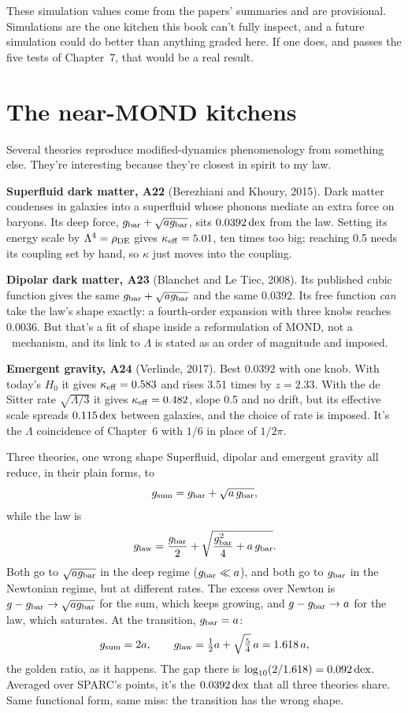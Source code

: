 \begin{honestbox}
These simulation values come from the papers' summaries and are provisional. Simulations are the one kitchen this book can't fully inspect, and a future simulation could do better than anything graded here. If one does, and passes the five tests of Chapter~7, that would be a real result.
\end{honestbox}

\section{The near-MOND kitchens}

Several theories reproduce modified-dynamics phenomenology from something else. They're interesting because they're closest in spirit to my law.

\textbf{Superfluid dark matter, A22} (Berezhiani and Khoury, 2015). Dark matter condenses in galaxies into a superfluid whose phonons mediate an extra force on baryons. Its deep force, $g_{\rm bar}+\sqrt{ag_{\rm bar}}$, sits $0.0392\,\mathrm{dex}$ from the law. Setting its energy scale by $\Lambda^4=\rho_{\rm DE}$ gives $\kappa_{\rm eff}=5.01$, ten times too big; reaching 0.5 needs its coupling set by hand, so $\kappa$ just moves into the coupling.

\textbf{Dipolar dark matter, A23} (Blanchet and Le Tiec, 2008). Its published cubic function gives the same $g_{\rm bar}+\sqrt{ag_{\rm bar}}$ and the same $0.0392$. Its free function \emph{can} take the law's shape exactly: a fourth-order expansion with three knobs reaches $0.0036$. But that's a fit of shape inside a reformulation of MOND, not a \LCDM\ mechanism, and its link to $\Lambda$ is stated as an order of magnitude and imposed.

\textbf{Emergent gravity, A24} (Verlinde, 2017). Best $0.0392$ with one knob. With today's $H_0$ it gives $\kappa_{\rm eff}=0.583$ and rises 3.51 times by $z=2.33$. With the de Sitter rate $\sqrt{\Lambda/3}$ it gives $\kappa_{\rm eff}=0.482$, slope 0.5 and no drift, but its effective scale spreads $0.115\,\mathrm{dex}$ between galaxies, and the choice of rate is imposed. It's the $\Lambda$ coincidence of Chapter~6 with $1/6$ in place of $1/2\pi$.

\begin{mathbox}{Three theories, one wrong shape}
Superfluid, dipolar and emergent gravity all reduce, in their plain forms, to
\[
g_{\rm sum}=g_{\rm bar}+\sqrt{a\,g_{\rm bar}},
\]
while the law is
\[
g_{\rm law}=\frac{g_{\rm bar}}{2}+\sqrt{\frac{g_{\rm bar}^2}{4}+a\,g_{\rm bar}}.
\]
Both go to $\sqrt{ag_{\rm bar}}$ in the deep regime ($g_{\rm bar}\ll a$), and both go to $g_{\rm bar}$ in the Newtonian regime, but at different rates. The excess over Newton is $g-g_{\rm bar}\to\sqrt{ag_{\rm bar}}$ for the sum, which keeps growing, and $g-g_{\rm bar}\to a$ for the law, which saturates. At the transition, $g_{\rm bar}=a$:
\[
g_{\rm sum}=2a,\qquad g_{\rm law}=\tfrac12a+\sqrt{\tfrac54}\,a=1.618\,a,
\]
the golden ratio, as it happens. The gap there is $\log_{10}(2/1.618)=0.092\,\mathrm{dex}$. Averaged over SPARC's points, it's the $0.0392\,\mathrm{dex}$ that all three theories share. Same functional form, same miss: the transition has the wrong shape.
\end{mathbox}

